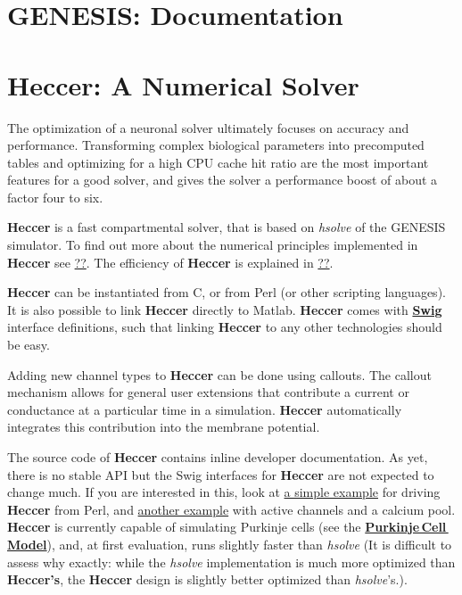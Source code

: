 \documentclass[12pt]{article}
\begin{document}
\section*{GENESIS: Documentation}

\section*{Heccer: A Numerical Solver}

%

%

The optimization of a neuronal solver ultimately focuses on accuracy and performance. Transforming complex biological parameters into precomputed tables and optimizing for a high CPU cache hit ratio are the most important features for a good solver, and gives the solver a performance boost of about a factor four to six.

{\bf Heccer} is a fast compartmental solver, that is based on {\it hsolve} of the GENESIS simulator. To find out more about the numerical principles implemented in {\bf Heccer} see \href{}{??}. The efficiency of {\bf Heccer} is explained in \href{}{??}.

{\bf Heccer} can be instantiated from C, or from Perl (or other scripting languages). It is also possible to link {\bf Heccer} directly to Matlab. {\bf Heccer} comes with \href{http://www.swig.org/}{\bf Swig} interface definitions, such that linking {\bf Heccer} to any other technologies should be easy.

Adding new channel types to {\bf Heccer} can be done using callouts. The callout mechanism allows for general user extensions that contribute a current or conductance at a particular time in a simulation. {\bf Heccer} automatically integrates this contribution into the membrane potential.

The source code of {\bf Heccer} contains inline developer documentation. As yet, there is no stable API but the Swig interfaces for {\bf Heccer} are not expected to change much. If you are interested in this, look at \href{}{a simple example} for driving {\bf Heccer} from Perl, and \href{}{another example} with active channels and a calcium pool. {\bf Heccer} is currently capable of simulating Purkinje cells (see the \href{../purkinje-cell-model/purkinje-cell-model.tex}{\bf Purkinje\,Cell\,Model}), and, at first evaluation, runs slightly faster than {\it hsolve} (It is difficult to assess why exactly: while the {\it hsolve} implementation is much more optimized than {\bf Heccer's}, the {\bf Heccer} design is slightly better optimized than {\it hsolve}'s.).
\end{document}
